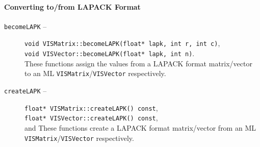 \paragraph{Converting to/from LAPACK Format}
\begin{description}
\item[{\tt becomeLAPK} --]
{\tt void VISMatrix::becomeLAPK(float* lapk, int r, int c)}, \\
{\tt void VISVector::becomeLAPK(float* lapk, int n)}.\\
These functions assign the values from a LAPACK format
matrix/vector to an ML {\tt VISMatrix}/{\tt VISVector} respectively.
\item[{\tt createLAPK} --]
{\tt float* VISMatrix::createLAPK() const},\\
{\tt float* VISVector::createLAPK() const},\\ and
These functions create a LAPACK format matrix/vector
from an ML {\tt VISMatrix}/{\tt VISVector} respectively.
\end{description}

